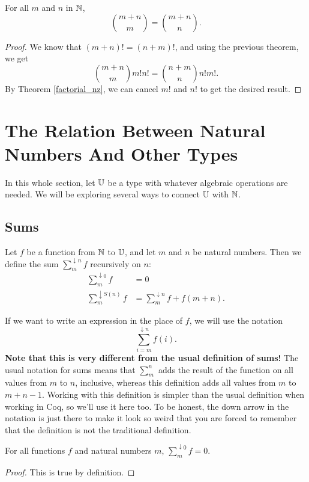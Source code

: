 \documentclass[../../math.tex]{subfiles}
\begin{document}
\begin{theorem}
    For all $m$ and $n$ in $\mathbb{N}$,
    \[
        \binom{m + n}{m} = \binom{m + n}{n}.
    \]
\end{theorem}
\begin{proof}
    We know that $(m + n)! = (n + m)!$, and using the previous theorem, we get
    \[
        \binom{m + n}{m} m! n! = \binom{n + m}{n} n! m!.
    \]
    By Theorem \ref{factorial_nz}, we can cancel $m!$ and $n!$ to get the
    desired result.
\end{proof}

\section{The Relation Between Natural Numbers And Other Types}

In this whole section, let $\mathbb{U}$ be a type with whatever algebraic operations are
needed.  We will be exploring several ways to connect $\mathbb{U}$ with $\mathbb{N}$.

\subsection{Sums}

\begin{definition}
    Let $f$ be a function from $\mathbb{N}$ to $\mathbb{U}$, and let $m$ and $n$ be natural
    numbers.  Then we define the sum $\sum_m^{\downarrow n} f$ recursively on
    $n$:
    \begin{align*}
        \sum_m^{\downarrow 0}    f &= 0 \\
        \sum_m^{\downarrow S(n)} f &= \sum_m^{\downarrow n} f + f(m + n).
    \end{align*}
\end{definition}
If we want to write an expression in the place of $f$, we will use the notation
\[
    \sum_{i = m}^{\downarrow n} f(i).
\]
\textbf{Note that this is very different from the usual definition of sums!} The
usual notation for sums means that $\sum_m^n$ adds the result of the function on
all values from $m$ to $n$, inclusive, whereas this definition adds all values
from $m$ to $m + n - 1$.  Working with this definition is simpler than the usual
definition when working in Coq, so we'll use it here too.  To be honest, the
down arrow in the notation is just there to make it look so weird that you are
forced to remember that the definition is not the traditional definition.

\begin{theorem}
    For all functions $f$ and natural numbers $m$, $\sum_m^{\downarrow 0} f =
    0$.
\end{theorem}
\begin{proof}
    This is true by definition.
\end{proof}
\end{document}
